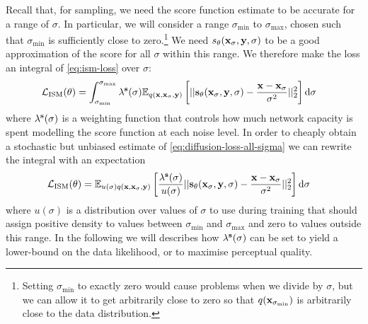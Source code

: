 Recall that, for sampling, we need the score function estimate to be accurate for a range of $\sigma$. In particular, we will consider a range $\sigma_\text{min}$ to $\sigma_\text{max}$, chosen such that $\sigma_\text{min}$ is sufficiently close to zero.\footnote{Setting $\sigma_\text{min}$ to exactly zero would cause problems when we divide by $\sigma$, but we can allow it to get arbitrarily close to zero so that $q({\mathbf{x}}_{\sigma_\text{min}})$ is arbitrarily close to the data distribution.} We need $s_\theta({\mathbf{x}}_\sigma, {\mathbf{y}}, \sigma)$ to be a good approximation of the score for all $\sigma$ within this range. We therefore make the loss an integral of \cref{eq:ism-loss} over $\sigma$:
\begin{align} \label{eq:diffusion-loss-all-sigma}
    \mathcal{L}_\text{ISM}(\theta) &= \int_{\sigma_\text{min}}^{\sigma_\text{max}} \lambda^{\mathbf{s}}(\sigma) \mathbb{E}_{q({\mathbf{x}}, {\mathbf{x}}_\sigma, {\mathbf{y}})} \left[ 
    || {\mathbf{s}}_\theta({\mathbf{x}}_\sigma, {\mathbf{y}}, \sigma) - \frac{{\mathbf{x}}-{\mathbf{x}}_\sigma}{\sigma^2} ||_2^2 \right] \mathrm{d}\sigma
\end{align}
where $\lambda^{\mathbf{s}}(\sigma)$ is a weighting function that controls how much network capacity is spent modelling the score function at each noise level. In order to cheaply obtain a stochastic but unbiased estimate of \cref{eq:diffusion-loss-all-sigma} we can rewrite the integral with an expectation
\begin{align} \label{eq:exp-diffusion-loss-all-sigma}
    \mathcal{L}_\text{ISM}(\theta) &= \mathbb{E}_{u(\sigma)q({\mathbf{x}}, {\mathbf{x}}_\sigma, {\mathbf{y}})} \left[ \frac{\lambda^{\mathbf{s}}(\sigma)}{u(\sigma)} 
    || {\mathbf{s}}_\theta({\mathbf{x}}_\sigma, {\mathbf{y}}, \sigma) - \frac{{\mathbf{x}}-{\mathbf{x}}_\sigma}{\sigma^2} ||_2^2 \right] \mathrm{d}\sigma
\end{align}
where $u(\sigma)$ is a distribution over values of $\sigma$ to use during training that should assign positive density to values between $\sigma_\text{min}$ and $\sigma_\text{max}$ and zero to values outside this range. In the following we will describes how $\lambda^{\mathbf{s}}(\sigma)$ can be set to yield a lower-bound on the data likelihood, or to maximise perceptual quality.

